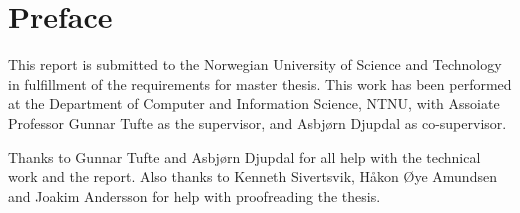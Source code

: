 \chapter*{Preface}
\thispagestyle{empty}
This report is submitted to the Norwegian University of Science and Technology
in fulfillment of the requirements for master thesis.  This work has been
performed at the Department of Computer and Information Science, NTNU, with
Assoiate Professor Gunnar Tufte as the supervisor, and Asbjørn Djupdal as
co-supervisor.

Thanks to Gunnar Tufte and Asbjørn Djupdal for all help with the technical work
and the report. Also thanks to Kenneth Sivertsvik, Håkon Øye Amundsen and Joakim
Andersson for help with proofreading the thesis.
